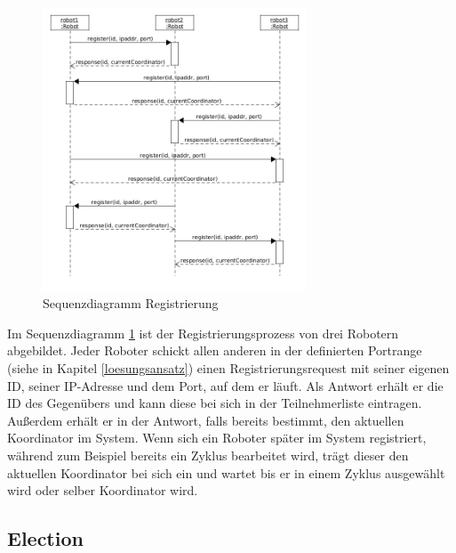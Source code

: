 \begin{figure}[h]
 \begin{center}
 \includegraphics[width=0.7\textwidth]{../diagrams/8_sequence_register.png}
 \end{center}
 \caption{Sequenzdiagramm Registrierung}
 \label{fig:seq_reg}
\end{figure}

Im Sequenzdiagramm \ref{fig:seq_reg} ist der Registrierungsprozess von drei Robotern abgebildet.
Jeder Roboter schickt allen anderen in der definierten Portrange (siehe in Kapitel \ref{loesungsansatz}) einen
Registrierungsrequest mit seiner eigenen ID, seiner IP-Adresse und dem Port, auf dem er läuft.
Als Antwort erhält er die ID des Gegenübers und kann diese bei sich in der Teilnehmerliste eintragen.
Außerdem erhält er in der Antwort, falls bereits bestimmt, den aktuellen Koordinator im System. Wenn sich
ein Roboter später im System registriert, während zum Beispiel bereits ein Zyklus bearbeitet wird, trägt dieser
den aktuellen Koordinator bei sich ein und wartet bis er in einem Zyklus ausgewählt wird oder selber Koordinator
wird.

\clearpage

\subsection{Election}

